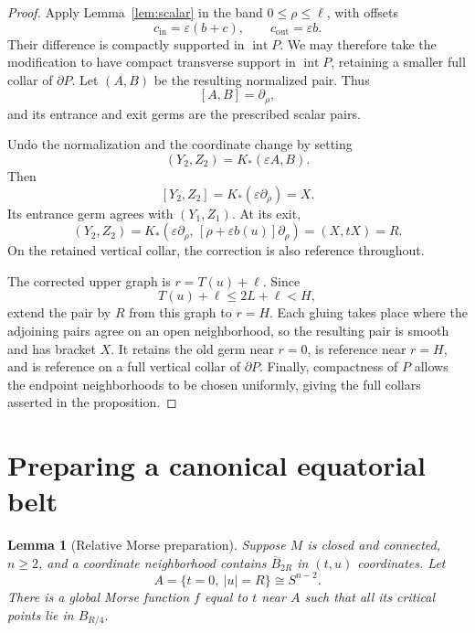 \documentclass[11pt]{article}
\newtheorem{lemma}[theorem]{Lemma}
\theoremstyle{remark}
\begin{document}
\begin{proof}
Apply Lemma~\ref{lem:scalar} in the band $0\le\rho\le\ell$, with offsets
$$
    c_{\mathrm{in}}=\varepsilon(b+c),
    \qquad
    c_{\mathrm{out}}=\varepsilon b.
$$
Their difference is compactly supported in $\operatorname{int}P$. We may therefore take the modification to have compact transverse support in $\operatorname{int}P$, retaining a smaller full collar of $\partial P$. Let $(A,B)$ be the resulting normalized pair. Thus
$$
    [A,B]=\partial_\rho,
$$
and its entrance and exit germs are the prescribed scalar pairs.

Undo the normalization and the coordinate change by setting
$$
    (Y_2,Z_2)=K_*(\varepsilon A,B).
$$
Then
$$
    [Y_2,Z_2]
    =
    K_*(\varepsilon\partial_\rho)
    =
    X.
$$
Its entrance germ agrees with $(Y_1,Z_1)$. At its exit,
$$
    (Y_2,Z_2)
    =
    K_*\left(
        \varepsilon\partial_\rho,\,
        [\rho+\varepsilon b(u)]\partial_\rho
    \right)
    =
    (X,tX)=R.
$$
On the retained vertical collar, the correction is also reference throughout.

The corrected upper graph is $r=T(u)+\ell$. Since
$$
    T(u)+\ell\le 2L+\ell<H,
$$
extend the pair by $R$ from this graph to $r=H$. Each gluing takes place where the adjoining pairs agree on an open
neighborhood, so the resulting pair is smooth and has bracket $X$. It retains the old germ near $r=0$, is reference near $r=H$, and is reference on a full vertical collar of $\partial P$. Finally, compactness of $P$ allows the endpoint neighborhoods to be chosen uniformly, giving the full collars asserted in the proposition.
\end{proof}

\section{Preparing a canonical equatorial belt}\label{sec:equator}

\begin{lemma}[Relative Morse preparation]\label{lem:morse} 
Suppose $M$ is closed and connected, $n\ge2$, and a coordinate neighborhood contains $\overline B_{2R}$ in $(t,u)$ coordinates. Let
$$
 A=\{t=0,\ |u|=R\}\cong S^{n-2}.
$$
There is a global Morse function $f$ equal to $t$ near $A$ such that all its critical points lie in $B_{R/4}$.
\end{lemma}
\end{document}
